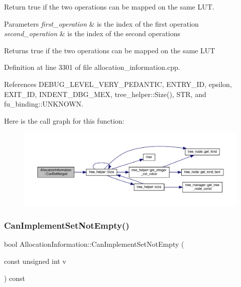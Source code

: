 Return true if the two operations can be mapped on the same L\+UT. 


\begin{DoxyParams}{Parameters}
{\em first\+\_\+operation} & is the index of the first operation \\
\hline
{\em second\+\_\+operation} & is the index of the second operations \\
\hline
\end{DoxyParams}
\begin{DoxyReturn}{Returns}
true if the two operations can be mapped on the same L\+UT 
\end{DoxyReturn}


Definition at line 3301 of file allocation\+\_\+information.\+cpp.



References D\+E\+B\+U\+G\+\_\+\+L\+E\+V\+E\+L\+\_\+\+V\+E\+R\+Y\+\_\+\+P\+E\+D\+A\+N\+T\+IC, E\+N\+T\+R\+Y\+\_\+\+ID, epsilon, E\+X\+I\+T\+\_\+\+ID, I\+N\+D\+E\+N\+T\+\_\+\+D\+B\+G\+\_\+\+M\+EX, tree\+\_\+helper\+::\+Size(), S\+TR, and fu\+\_\+binding\+::\+U\+N\+K\+N\+O\+WN.

Here is the call graph for this function\+:
\nopagebreak
\begin{figure}[H]
\begin{center}
\leavevmode
\includegraphics[width=350pt]{d7/d79/classAllocationInformation_ac13ce76541d29e2028a9beaa2df92ec7_cgraph}
\end{center}
\end{figure}
\mbox{\label{classAllocationInformation_ab2d344c6b8ed05937f994c1bb04d66d4}} 
\subsubsection{\texorpdfstring{Can\+Implement\+Set\+Not\+Empty()}{CanImplementSetNotEmpty()}}
{\footnotesize\ttfamily bool Allocation\+Information\+::\+Can\+Implement\+Set\+Not\+Empty (\begin{DoxyParamCaption}\item[{const unsigned int}]{v }\end{DoxyParamCaption}) const}



